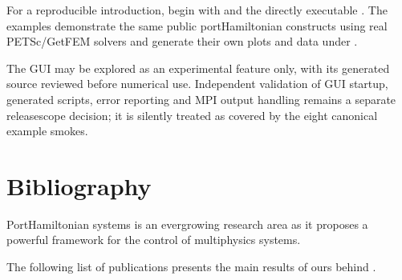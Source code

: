 \documentclass[letterpaper,10pt,english]{sphinxmanual}
\begin{document}
\sphinxAtStartPar
For a reproducible introduction, begin with
{\hyperref[\detokenize{started::doc}]{}} and the directly executable
{\hyperref[\detokenize{examples::doc}]{}}. The examples demonstrate the same public
port\sphinxhyphen{}Hamiltonian constructs using real PETSc/GetFEM solvers
and generate their own plots and data under
.

\sphinxAtStartPar
The GUI may be explored as an experimental feature only,
with its generated source reviewed before numerical use.
Independent validation of GUI startup, generated scripts,
error reporting and MPI output handling remains a
separate release\sphinxhyphen{}scope decision; it is  silently
treated as covered by the eight canonical example smokes.

\sphinxstepscope


\section{Bibliography}
\label{\detokenize{biblio:bibliography}}\label{\detokenize{biblio::doc}}\label{\detokenize{biblio:biblio}}
\sphinxAtStartPar
Port\sphinxhyphen{}Hamiltonian systems is an ever\sphinxhyphen{}growing research area as it proposes a powerful framework for the control of multi\sphinxhyphen{}physics systems.

\sphinxAtStartPar
The following list of publications presents the main results of ours behind .
\end{document}

